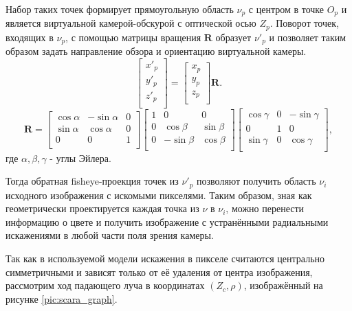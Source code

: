 Набор таких точек формирует прямоугольную область $\nu_p$ с центром в точке $O_p$ и является виртуальной камерой-обскурой        
с оптической осью $Z_p$. Поворот точек, входящих в $\nu_p$, с помощью матрицы вращения $\bm{R}$ образует $\nu'_p$ и
 позволяет таким образом задать направление обзора и ориентацию виртуальной камеры. 
\begin{equation}
    \label{eq:sweeped}
    \left[\begin{matrix}x'_p\\y'_p\\z'_p\\\end{matrix}\right] = \left[\begin{matrix}x_p\\y_p\\z_p\\\end{matrix}\right] \bm{R}.
\end{equation}  
\begin{equation}
    \label{eq:R}
    \bm{R} = \left[\begin{matrix}\cos{\alpha}&-\sin{\alpha}&0\\\sin{\alpha}&\cos{\alpha}&0\\0&0&1\\\end{matrix}\right]\left[\begin{matrix}1&0&0\\0&\cos{\beta}&\sin{\beta}\\0&-\sin{\beta}&\cos{\beta}\\\end{matrix}\right]\left[\begin{matrix}\cos{\gamma}&0&-\sin{\gamma}\\0&1&0\\\sin{\gamma}&0&\cos{\gamma}\\\end{matrix}\right],
\end{equation} 
где $\alpha, \beta, \gamma$ - углы Эйлера. %

Тогда обратная fisheye-проекция точек из $\nu'_p$ позволяют получить область $\nu_i$ исходного изображения с искомыми пикселями. 
Таким образом, зная как геометрически проектируется каждая точка из $\nu$ в $\nu_i$, можно перенести информацию о цвете и получить 
изображение с устранёнными радиальными искажениями в любой части поля зрения камеры. 

Так как в используемой модели искажения в пикселе считаются центрально симметричными и зависят только от её удаления от центра изображения, 
рассмотрим ход падающего луча в координатах $(Z_c, \rho)$, изображённый на рисунке \ref{pic:scara_graph}.

